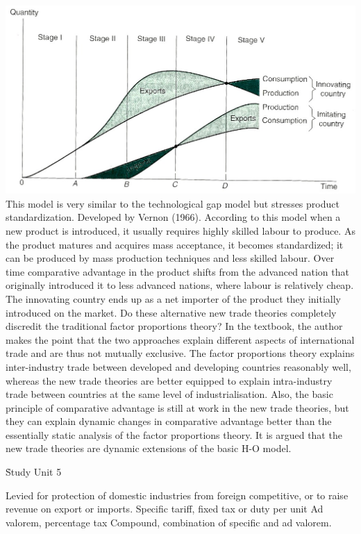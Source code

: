 \documentclass[12pt]{examnotes}
\begin{document}
\includegraphics[scale=0.3]{./imgs/64.jpg}
\ra This model is very similar to the technological gap model but stresses product standardization.
\ra Developed by Vernon (1966). 
\ra According to this model when a new product is introduced, it usually requires highly skilled labour to produce. As the product matures and acquires mass acceptance, it becomes standardized; it can be produced by mass production techniques and less skilled labour. 
\ra Over time comparative advantage in the product shifts from the advanced nation that originally introduced it to less advanced nations, where labour is relatively cheap. The innovating country ends up as a net importer of the product they initially introduced on the market.
Do these alternative new trade theories completely discredit the traditional factor proportions theory? In the textbook, the author makes the point that the two approaches explain different aspects of international trade and are thus not mutually exclusive. The factor proportions theory explains inter-industry trade between developed and developing countries reasonably well, whereas the new trade theories are better equipped to explain intra-industry trade between countries at the same level of industrialisation. Also, the basic principle of comparative advantage is still at work in the new trade theories, but they can explain dynamic changes in comparative advantage better than the essentially static analysis of the factor proportions theory. It is argued that the new trade theories are dynamic extensions of the basic H-O model.

\h{Study Unit 5}

\ra Levied for protection of domestic industries from foreign competitive, or to raise revenue on export or imports.
 Specific tariff, fixed tax or duty per unit
 Ad valorem, percentage tax
 Compound, combination of specific and ad valorem.
\end{document}
